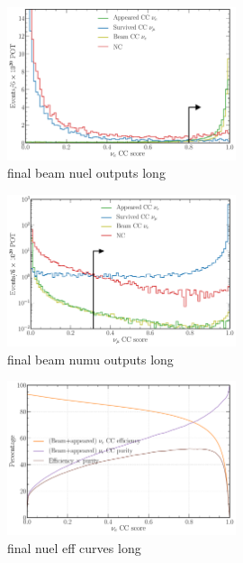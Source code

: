 \begin{figure} %
    \includegraphics[width=0.6\textwidth]{diagrams/7-cvn/chipsnet/final_beam_nuel_outputs.pdf}
    \caption[final beam nuel outputs short]
    {final beam nuel outputs long}
    \label{fig:final_beam_nuel_outputs}
\end{figure}

\begin{figure} %
    \includegraphics[width=0.6\textwidth]{diagrams/7-cvn/chipsnet/final_beam_numu_outputs.pdf}
    \caption[final beam numu outputs short]
    {final beam numu outputs long}
    \label{fig:final_beam_numu_outputs}
\end{figure}

\begin{figure} %
    \includegraphics[width=0.6\textwidth]{diagrams/7-cvn/chipsnet/final_nuel_eff_curves.pdf}
    \caption[final nuel eff curves short]
    {final nuel eff curves long}
    \label{fig:final_nuel_eff_curves}
\end{figure}

